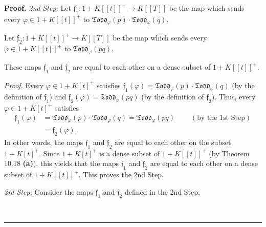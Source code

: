\documentclass[numbers=enddot,12pt,final,onecolumn,notitlepage]{scrartcl}%
\newenvironment{proof}[1][Proof]{\noindent\textbf{#1.} }{\ \rule{0.5em}{0.5em}}
\begin{document}
\begin{proof}
\textit{2nd Step:} Let $\mathfrak{f}_{1}:1+K\left[  \left[  t\right]  \right]
^{+}\rightarrow K\left[  \left[  T\right]  \right]  $ be the map which sends
every $\varphi\in1+K\left[  \left[  t\right]  \right]  ^{+}$ to
$\mathfrak{Todd}_{\varphi}\left(  p\right)  \cdot\mathfrak{Todd}_{\varphi
}\left(  q\right)  $.

Let $\mathfrak{f}_{2}:1+K\left[  \left[  t\right]  \right]  ^{+}\rightarrow
K\left[  \left[  T\right]  \right]  $ be the map which sends every $\varphi
\in1+K\left[  \left[  t\right]  \right]  ^{+}$ to $\mathfrak{Todd}_{\varphi
}\left(  pq\right)  $.

These maps $\mathfrak{f}_{1}$ and $\mathfrak{f}_{2}$ are equal to each other
on a dense subset of $1+K\left[  \left[  t\right]  \right]  ^{+}$.

\textit{Proof.} Every $\varphi\in1+K\left[  t\right]  ^{+}$ satisfies
$\mathfrak{f}_{1}\left(  \varphi\right)  =\mathfrak{Todd}_{\varphi}\left(
p\right)  \cdot\mathfrak{Todd}_{\varphi}\left(  q\right)  $ (by the definition
of $\mathfrak{f}_{1}$) and $\mathfrak{f}_{2}\left(  \varphi\right)
=\mathfrak{Todd}_{\varphi}\left(  pq\right)  $ (by the definition of
$\mathfrak{f}_{2}$). Thus, every $\varphi\in1+K\left[  t\right]  ^{+}$
satisfies%
\begin{align*}
\mathfrak{f}_{1}\left(  \varphi\right)   &  =\mathfrak{Todd}_{\varphi}\left(
p\right)  \cdot\mathfrak{Todd}_{\varphi}\left(  q\right)  =\mathfrak{Todd}%
_{\varphi}\left(  pq\right)  \ \ \ \ \ \ \ \ \ \ \left(  \text{by the 1st
Step}\right) \\
&  =\mathfrak{f}_{2}\left(  \varphi\right)  .
\end{align*}
In other words, the maps $\mathfrak{f}_{1}$ and $\mathfrak{f}_{2}$ are equal
to each other on the subset $1+K\left[  t\right]  ^{+}$. Since $1+K\left[
t\right]  ^{+}$ is a dense subset of $1+K\left[  \left[  t\right]  \right]
^{+}$ (by Theorem 10.18 \textbf{(a)}), this yields that the maps
$\mathfrak{f}_{1}$ and $\mathfrak{f}_{2}$ are equal to each other on a dense
subset of $1+K\left[  \left[  t\right]  \right]  ^{+}$. This proves the 2nd Step.

\textit{3rd Step:} Consider the maps $\mathfrak{f}_{1}$ and $\mathfrak{f}_{2}$
defined in the 2nd Step.


\end{proof}
\end{document}
